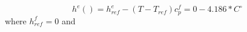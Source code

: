 \begin{equation}
h^e() = h^e_{ref} -(T-T_{ref})c_p^f = 0 - 4.186*  C^\circ   
\end{equation}
where \(h_{ref^{ }}^f=0 \) and 
